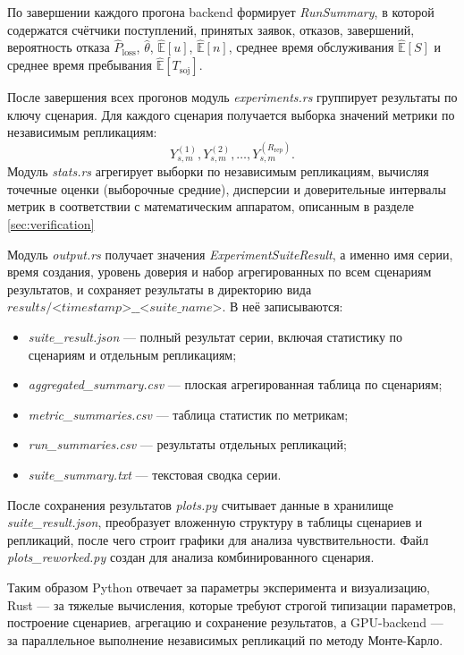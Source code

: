 По завершении каждого прогона backend формирует \textit{RunSummary}, в которой содержатся счётчики поступлений, принятых заявок, отказов, завершений, вероятность отказа $\widehat{P}_{\mathrm{loss}}$, $\widehat{\theta}$, $\widehat{\mathbb{E}}[u]$, $\widehat{\mathbb{E}}[n]$, среднее время обслуживания $\widehat{\mathbb{E}}[S]$ и среднее время пребывания $\widehat{\mathbb{E}}[T_{\mathrm{soj}}]$.

После завершения всех прогонов модуль \textit{experiments.rs} группирует результаты по ключу сценария\cite{law2015_simulation_modeling,welch1983_statistical_analysis_simulation}. Для каждого сценария получается выборка значений метрики по независимым репликациям:
$$
Y_{s,m}^{(1)},Y_{s,m}^{(2)},\ldots,Y_{s,m}^{(R_{\mathrm{rep}})}.
$$
Модуль \textit{stats.rs} агрегирует выборки по независимым репликациям, вычисляя точечные оценки (выборочные средние), дисперсии и доверительные интервалы метрик в соответствии с математическим аппаратом, описанным в разделе \ref{sec:verification}

Модуль \textit{output.rs} получает значения \textit{ExperimentSuiteResult}, а именно имя серии, время создания, уровень доверия и набор агрегированных по всем сценариям результатов, и сохраняет результаты в директорию вида $\textit{results/<timestamp>\_\_<suite\_name>}$.
В неё записываются:
\begin{itemize}
    \item \textit{suite\_result.json} --- полный результат серии, включая статистику по сценариям и отдельным репликациям;
    \item \textit{aggregated\_summary.csv} --- плоская агрегированная таблица по сценариям;
    \item \textit{metric\_summaries.csv} --- таблица статистик по метрикам;
    \item \textit{run\_summaries.csv} --- результаты отдельных репликаций;
    \item \textit{suite\_summary.txt} --- текстовая сводка серии.
\end{itemize}

После сохранения результатов \textit{plots.py} считывает данные в хранилище \textit{suite\_result.json}, преобразует вложенную структуру в таблицы сценариев и репликаций, после чего строит графики для анализа чувствительности. Файл \textit{plots\_reworked.py} создан для анализа комбинированного сценария. 

Таким образом Python отвечает за параметры эксперимента и визуализацию, Rust --- за тяжелые вычисления, которые требуют строгой типизации параметров, построение сценариев, агрегацию и сохранение результатов, а GPU-backend --- за параллельное выполнение независимых репликаций по методу Монте-Карло. 


